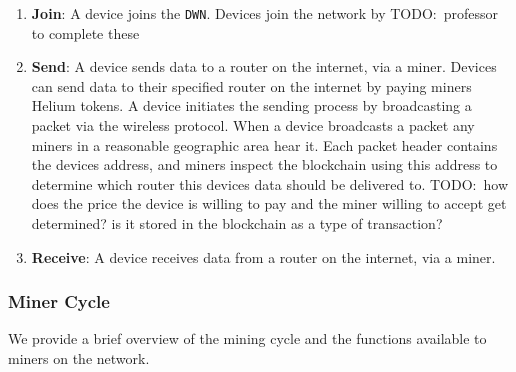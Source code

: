 \documentclass[letterpaper,11pt]{article}
\newcommand{\todo}[1]{}
\renewcommand{\todo}[1]{{\color{red} TODO:\ {#1}}}
\begin{document}
\begin{enumerate}
  \item \textbf{Join}: A device joins the \verb|DWN|.
  Devices join the network by \todo{professor to complete these}

  \item \textbf{Send}: A device sends data to a router on the internet, via a miner.
  Devices can send data to their specified router on the internet by paying miners Helium tokens.
  A device initiates the sending process by broadcasting a packet via the wireless protocol. When a device broadcasts a packet any miners in a reasonable geographic area hear it. Each packet header contains the devices address, and miners inspect the blockchain using this address to determine which router this devices data should be delivered to. \todo{how does the price the device is willing to pay and the miner willing to accept get determined? is it stored in the blockchain as a type of transaction?}

  \item \textbf{Receive}: A device receives data from a router on the internet, via a miner.


\end{enumerate}

\subsubsection{Miner Cycle}\label{mining}

We provide a brief overview of the mining cycle and the functions available to miners on the network.
\end{document}
